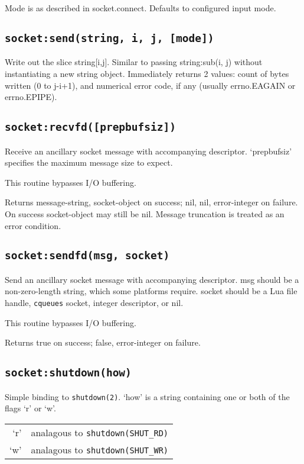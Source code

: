 \documentclass[11pt, oneside]{memoir}
\newcommand*{\cqueues}[0]{\texttt{cqueues}\xspace}
\newcommand*{\syscall}[1]{\texttt{#1}\xspace}
\newcommand*{\fn}[1]{\texttt{#1}\xspace}
\begin{document}
	Mode is as described in socket.connect. Defaults to configured
	input mode.

\subsection[\fn{socket:send}]{\fn{socket:send(string, i, j, [mode])}}
	Write out the slice string[i,j]. Similar to passing string:sub(i, j)
	without instantiating a new string object. Immediately returns 2
	values: count of bytes written (0 to j-i+1), and numerical error
	code, if any (usually errno.EAGAIN or errno.EPIPE).

\subsection[\fn{socket:recvfd}]{\fn{socket:recvfd([prepbufsiz])}}
	Receive an ancillary socket message with accompanying descriptor.
	`prepbufsiz' specifies the maximum message size to expect.

	This routine bypasses I/O buffering.

	Returns message-string, socket-object on success; nil, nil,
	error-integer on failure. On success socket-object may still be nil.
	Message truncation is treated as an error condition.

\subsection[\fn{socket:sendfd}]{\fn{socket:sendfd(msg, socket)}}
	Send an ancillary socket message with accompanying descriptor. msg
	should be a non-zero-length string, which some platforms require.
	socket should be a Lua file handle, \cqueues socket, integer
	descriptor, or nil.

	This routine bypasses I/O buffering.

	Returns true on success; false, error-integer on failure.

\subsection[\fn{socket:shutdown}]{\fn{socket:shutdown(how)}}
Simple binding to \syscall{shutdown(2)}. `how' is a string containing one or both of the flags `r' or `w'.

\begin{tabular}{r | l}
`r' & analagous to \syscall{shutdown(SHUT\_RD)} \\
`w' & analagous to \syscall{shutdown(SHUT\_WR)} \\
\end{tabular}
\end{document}
